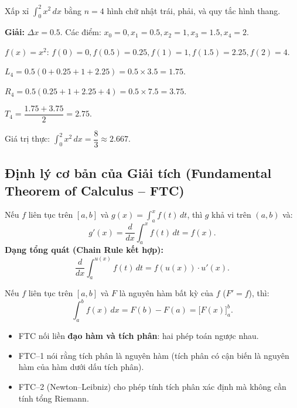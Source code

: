 \documentclass[12pt,a4paper]{article}
\begin{document}
\begin{vidu}
  Xấp xỉ $\displaystyle\int_0^2 x^2\,dx$ bằng $n = 4$ hình chữ nhật trái, phải, và quy tắc hình thang.

  \medskip\textbf{Giải:}
  $\Delta x = 0.5$. Các điểm: $x_0=0, x_1=0.5, x_2=1, x_3=1.5, x_4=2$.

  $f(x) = x^2$: $f(0)=0, f(0.5)=0.25, f(1)=1, f(1.5)=2.25, f(2)=4$.

  $L_4 = 0.5(0 + 0.25 + 1 + 2.25) = 0.5 \times 3.5 = 1.75$.

  $R_4 = 0.5(0.25 + 1 + 2.25 + 4) = 0.5 \times 7.5 = 3.75$.

  $T_4 = \dfrac{1.75 + 3.75}{2} = 2.75$.

  Giá trị thực: $\displaystyle\int_0^2 x^2\,dx = \dfrac{8}{3} \approx 2.667$.
\end{vidu}

\subsection{Định lý cơ bản của Giải tích (Fundamental Theorem of Calculus -- FTC)}

\begin{dinhly}[title={FTC -- Phần 1: Đạo hàm của hàm tích phân có cận biến}]
  Nếu $f$ liên tục trên $[a, b]$ và $g(x) = \displaystyle\int_a^x f(t)\,dt$, thì $g$ khả vi trên $(a, b)$ và:
  \[
    g'(x) = \frac{d}{dx}\int_a^x f(t)\,dt = f(x).
  \]
  \textbf{Dạng tổng quát (Chain Rule kết hợp):}
  \[
    \frac{d}{dx}\int_a^{u(x)} f(t)\,dt = f(u(x)) \cdot u'(x).
  \]
\end{dinhly}

\begin{dinhly}[title={FTC -- Phần 2: Công thức Newton--Leibniz}]
  Nếu $f$ liên tục trên $[a, b]$ và $F$ là nguyên hàm bất kỳ của $f$ ($F' = f$), thì:
  \[
    \int_a^b f(x)\,dx = F(b) - F(a) = \bigl[F(x)\bigr]_a^b.
  \]
\end{dinhly}

\begin{luuy}
  \begin{itemize}
    \item FTC nối liền \textbf{đạo hàm và tích phân}: hai phép toán ngược nhau.
    \item FTC--1 nói rằng tích phân là nguyên hàm (tích phân có cận biến là nguyên hàm của hàm dưới dấu tích phân).
    \item FTC--2 (Newton--Leibniz) cho phép tính tích phân xác định mà không cần tính tổng Riemann.
  \end{itemize}
\end{luuy}
\end{document}
